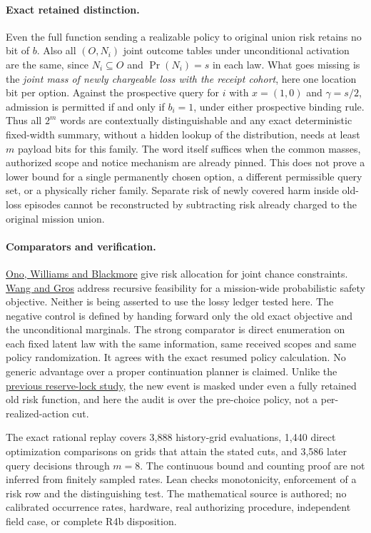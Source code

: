 \documentclass{article}
\begin{document}
\paragraph{Exact retained distinction.}
Even the full function sending a realizable policy to original
union risk retains no bit of \(b\). Also all \((O,N_i)\) joint
outcome tables under unconditional activation are the same,
since \(N_i\subseteq O\) and \(\Pr(N_i)=s\) in each law.
What goes missing is the \emph{joint mass of newly chargeable
loss with the receipt cohort}, here one location bit per option.
Against the prospective query for \(i\) with
\(x=(1,0)\) and \(\gamma=s/2\), admission is permitted if and
only if \(b_i=1\), under either prospective binding rule.
Thus all \(2^m\) words are contextually distinguishable and
any exact deterministic fixed-width summary, without a hidden
lookup of the distribution, needs at least \(m\) payload bits
for this family. The word itself suffices when the common masses,
authorized scope and notice mechanism are already pinned.
This does not prove a lower bound for a single permanently chosen
option, a different permissible query set, or a physically richer
family. Separate risk of newly covered harm inside old-loss
episodes cannot be reconstructed by subtracting risk already
charged to the original mission union.

\paragraph{Comparators and verification.}
\href{https://groups.csail.mit.edu/mers/publication_uploads/Publications/2013/ono_williams_blackmore/ppcdsubr.pdf}{Ono,
Williams and Blackmore} give risk allocation for joint chance
constraints. \href{https://arxiv.org/abs/2110.04570}{Wang and Gros}
address recursive feasibility for a mission-wide probabilistic
safety objective. Neither is being asserted to use the lossy ledger
tested here. The negative control is defined by handing forward
only the old exact objective and the unconditional marginals.
The strong comparator is direct enumeration on each fixed
latent law with the same information, same received scopes and
same policy randomization. It agrees with the exact resumed
policy calculation. No generic advantage over a proper
continuation planner is claimed. Unlike the
\href{https://github.com/eternal-november/eos-research-programmes/pull/357}{previous
reserve-lock study}, the new event is masked under even a
fully retained old risk function, and here the audit is over
the pre-choice policy, not a per-realized-action cut.

The exact rational replay covers 3,888 history-grid evaluations,
1,440 direct optimization comparisons on grids that attain the
stated cuts, and 3,586 later query decisions through \(m=8\).
The continuous bound and counting proof are not inferred from
finitely sampled rates. Lean checks monotonicity, enforcement of
a risk row and the distinguishing test. The mathematical
source is authored; no calibrated occurrence rates, hardware,
real authorizing procedure, independent field case, or complete
R4b disposition.
\end{document}
